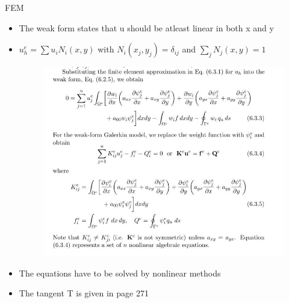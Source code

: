 	\begin{frame}{FEM}
		\begin{itemize}
			\item The weak form states that u should be atleast linear in both x and y
			\item $u_h^e = \sum u_iN_i(x,y)$ with $N_i(x_j,y_j) = \delta_{ij} $ and $\sum_j N_j(x,y)=1$
			\begin{figure}
				\centering
				\includegraphics[width=0.8 \linewidth]{Figure/fig26} 		
			\end{figure}	
		\end{itemize}
	\end{frame}


	\begin{frame}
		\begin{itemize}
			\item The equations have to be solved by nonlinear methods
			\item The tangent T is given in page 271
		\end{itemize}
	\end{frame}


